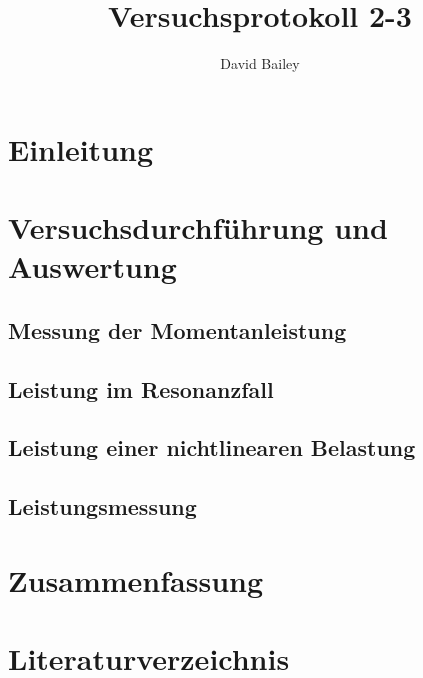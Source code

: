 \documentclass[11pt,a4paper]{article}
\author{David Bailey}
\title{Versuchsprotokoll 2-3}
\numberwithin{equation}{subsection}
\begin{document}



\tableofcontents

\newpage

\section{Einleitung}


\section{Versuchsdurchführung und Auswertung}
\subsection{Messung der Momentanleistung}


\newpage
\subsection{Leistung im Resonanzfall}


\newpage
\subsection{Leistung einer nichtlinearen Belastung}


\subsection{Leistungsmessung}


\newpage
\section{Zusammenfassung}


\newpage

\setcounter{section}{0}
\renewcommand{\thesection}{\Alph{section}}
\section{Literaturverzeichnis}
\printbibliography
\newpage

\end{document}

